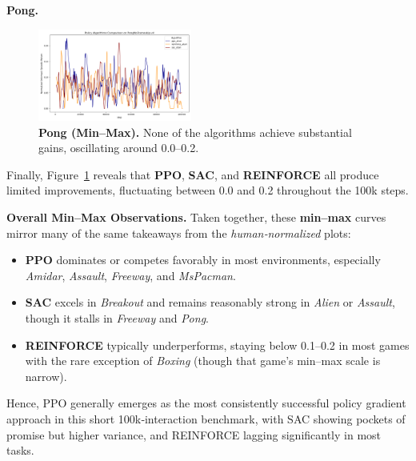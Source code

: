 \textbf{Pong.}
\begin{figure}[htbp]
	\centering
	\includegraphics[width=0.45\textwidth]{figures/policy_comparison/charts_episodic_return_minmax_comparison_PongNoFrameskip-v4_policy.png}
	\caption{\textbf{Pong (Min--Max).} None of the algorithms achieve substantial gains, oscillating around 0.0--0.2.}
	\label{fig:policy_minmax_pong}
\end{figure}

Finally, Figure~\ref{fig:policy_minmax_pong} reveals that \textbf{PPO}, \textbf{SAC}, and \textbf{REINFORCE} all produce limited improvements, fluctuating between 0.0 and 0.2 throughout the 100k steps.

\medskip
\noindent
\textbf{Overall Min--Max Observations.}  
Taken together, these \textbf{min--max} curves mirror many of the same takeaways from the \emph{human‐normalized} plots:
\begin{itemize}
	\item \textbf{PPO} dominates or competes favorably in most environments, especially \emph{Amidar}, \emph{Assault}, \emph{Freeway}, and \emph{MsPacman}. 
	\item \textbf{SAC} excels in \emph{Breakout} and remains reasonably strong in \emph{Alien} or \emph{Assault}, though it stalls in \emph{Freeway} and \emph{Pong}.
	\item \textbf{REINFORCE} typically underperforms, staying below 0.1--0.2 in most games with the rare exception of \emph{Boxing} (though that game’s min–max scale is narrow).
\end{itemize}
Hence, PPO generally emerges as the most consistently successful policy gradient approach in this short 100k‐interaction benchmark, with SAC showing pockets of promise but higher variance, and REINFORCE lagging significantly in most tasks.
